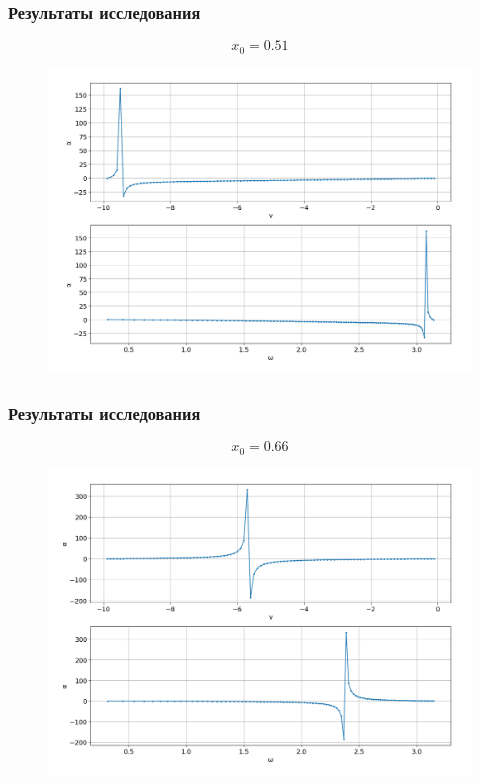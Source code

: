\documentclass[fullscreen=true, unicode, bookmarks=false]{beamer}
\begin{document}
\begin{frame}
\frametitle{ Результаты исследования } 

{\tiny  $$ x_0 = 0.51 $$}
\vspace{-0.8cm}
\begin{figure}
\includegraphics[scale=0.35]{0,51.png} 
\end{figure}

\end{frame}

\begin{frame}
\frametitle{ Результаты исследования } 

{\tiny  $$ x_0 = 0.66 $$}
\vspace{-0.8cm}
\begin{figure}
\includegraphics[scale=0.35]{0,66.png} 
\end{figure}

\end{frame}
\end{document}
